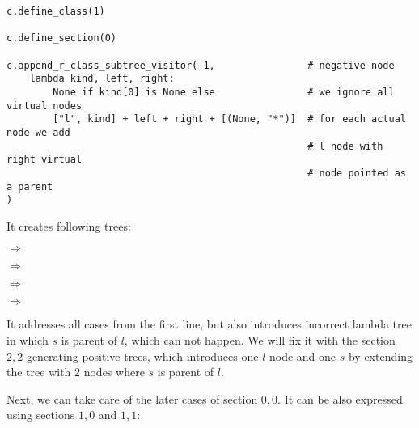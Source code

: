 \documentclass[final]{article}
\theoremstyle{definition}
\theoremstyle{remark}
\newcommand{\includeinlinesvg}[2]{\begin{minipage}{#1\textwidth}\end{minipage}}
\begin{document}
\begin{lstlisting}
c.define_class(1)

c.define_section(0)

c.append_r_class_subtree_visitor(-1,                # negative node
    lambda kind, left, right:
        None if kind[0] is None else                # we ignore all virtual nodes
        ["l", kind] + left + right + [(None, "*")]  # for each actual node we add
                                                    # l node with right virtual
                                                    # node pointed as a parent
)
\end{lstlisting}

It creates following trees:

\includeinlinesvg{.24}{trees_100__0_base}\(\Rightarrow\)\includeinlinesvg{.24}{trees_100__0}%
\includeinlinesvg{.24}{trees_100__1_base}\(\Rightarrow\)\includeinlinesvg{.24}{trees_100__1}%

\includeinlinesvg{.24}{trees_100__2_base}\(\Rightarrow\)\includeinlinesvg{.24}{trees_100__2}%
\includeinlinesvg{.24}{trees_100__3_base}\(\Rightarrow\)\includeinlinesvg{.24}{trees_100__3}%

It addresses all cases from the first line, but also introduces incorrect lambda tree in which \(s\) is parent of \(l\), which can not happen. We will fix it with the section \(2,2\) generating positive trees, which introduces one \(l\) node and one \(s\) by extending the tree with \(2\) nodes where \(s\) is parent of \(l\).

Next, we can take care of the later cases of section \(0, 0\). It can be also expressed using sections \(1, 0\) and \(1, 1\):
\end{document}

